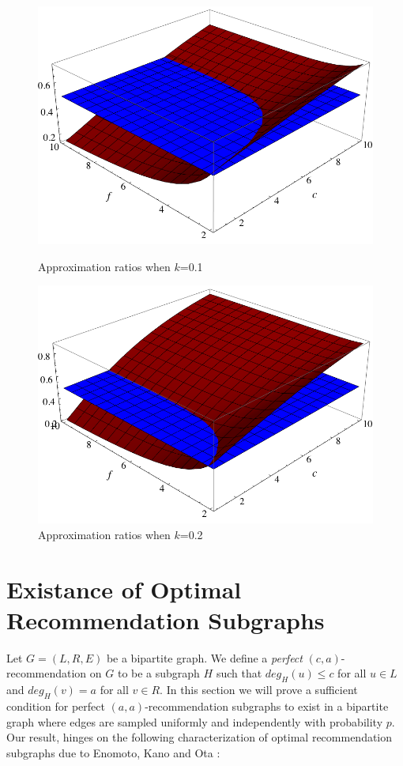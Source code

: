 \documentclass[11pt]{article}
\begin{document}
\begin{figure}[h]
\begin{minipage}[h]{0.45\linewidth}
\centering
\includegraphics[width=\textwidth]{k=0_1.png}
\caption{Approximation ratios when $k$=0.1}
\end{minipage}
\hspace{0.5cm}
\begin{minipage}[h]{0.45\linewidth}
\centering
\includegraphics[width=\textwidth]{k=0_2.png}
\caption{Approximation ratios when $k$=0.2}
\end{minipage}
\end{figure}


\section{Existance of Optimal Recommendation Subgraphs}
Let $G=(L,R,E)$ be a bipartite graph. We define a \emph{perfect} $(c,a)$-recommendation on $G$ to be a subgraph $H$ such that $deg_H(u)\leq c$ for all $u\in L$ and $deg_H(v)=a$ for all $v\in R$. In this section we will prove a sufficient condition for perfect $(a,a)$-recommendation subgraphs to exist in a bipartite graph where edges are sampled uniformly and independently with probability $p$. Our result, hinges on the following characterization of optimal recommendation subgraphs due to Enomoto, Kano and Ota \cite{EKO}:
\end{document}
